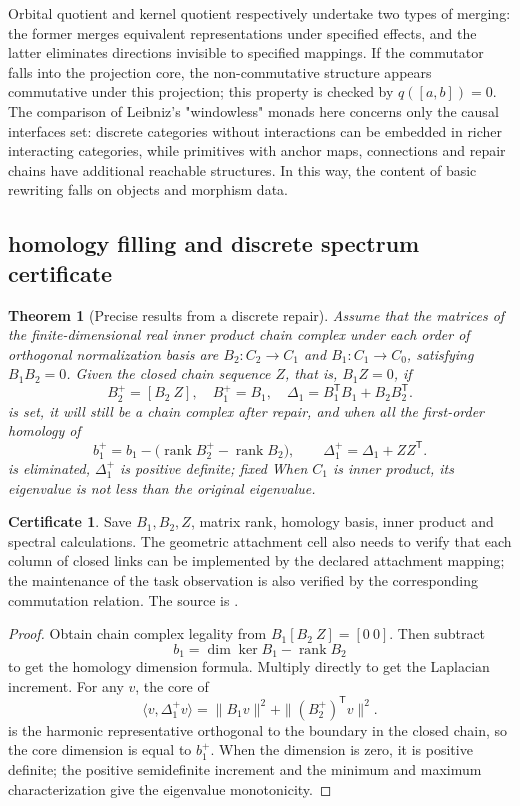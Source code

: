 \documentclass[11pt,a4paper]{article}
\theoremstyle{plain}
\newtheorem{theorem}{Theorem}[section]
\theoremstyle{definition}
\newtheorem*{certificate}{Certificate}
\theoremstyle{remark}
\begin{document}
\begin{CJK*}
Orbital quotient and kernel quotient respectively undertake two types of merging: the former merges equivalent representations under specified effects, and the latter eliminates directions invisible to specified mappings. If the commutator falls into the projection core, the non-commutative structure appears commutative under this projection; this property is checked by $q([a,b])=0$. The comparison of Leibniz's "windowless" monads here concerns only the causal interfaces set: discrete categories without interactions can be embedded in richer interacting categories, while primitives with anchor maps, connections and repair chains have additional reachable structures. In this way, the content of basic rewriting falls on objects and morphism data.

\subsection { homology filling and discrete spectrum certificate }

\begin{theorem}
[Precise results from a discrete repair]\label{ss:cell-repair}
Assume that the matrices of the finite-dimensional real inner product chain complex under each order of orthogonal normalization basis are $B_2:C_2\to C_1$ and $B_1:C_1\to C_0$, satisfying $B_1B_2=0$. Given the closed chain sequence $Z$, that is, $B_1Z=0$, if \[
 B_2^+=[B_2\ Z],\quad B_1^+=B_1,
 \quad \Delta_1=B_1^{\mathsf T}B_1+B_2B_2^{\mathsf T}.
\] is set, it will still be a chain complex after repair, and when all the first-order homology of \[
 b_1^+=b_1-\bigl(\operatorname{rank}B_2^+-\operatorname{rank}B_2\bigr),
 \qquad \Delta_1^+=\Delta_1+ZZ^{\mathsf T}.
\] is eliminated, $\Delta_1^+$ is positive definite; fixed When $C_1$ is inner product, its eigenvalue is not less than the original eigenvalue.\end{theorem}
\begin{certificate}
Save $B_1,B_2,Z$, matrix rank, homology basis, inner product and spectral calculations. The geometric attachment cell also needs to verify that each column of closed links can be implemented by the declared attachment mapping; the maintenance of the task observation is also verified by the corresponding commutation relation. The source is \cite{S21}.\end{certificate}
\begin{proof}
Obtain chain complex legality from $B_1[B_2\ Z]=[0\ 0]$. Then subtract \[
 b_1=\dim\ker B_1-\operatorname{rank}B_2
\] to get the homology dimension formula. Multiply directly to get the Laplacian increment. For any $v$, the core of \[
 \langle v,\Delta_1^+v\rangle
 =\|B_1v\|^2+\|(B_2^+)^{\mathsf T}v\|^2.
\] is the harmonic representative orthogonal to the boundary in the closed chain, so the core dimension is equal to $b_1^+$. When the dimension is zero, it is positive definite; the positive semidefinite increment and the minimum and maximum characterization give the eigenvalue monotonicity.\end{proof}



\end{CJK*}
\end{document}
